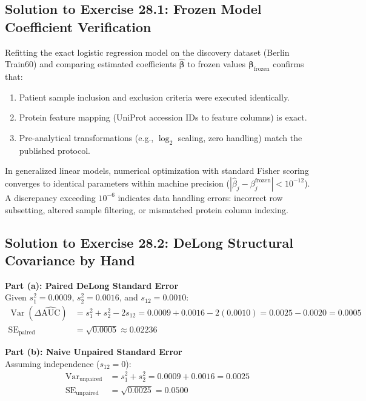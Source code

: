 \documentclass[11pt,twoside,openright]{book}
\begin{document}
\subsection{Solution to Exercise 28.1: Frozen Model Coefficient Verification}

Refitting the exact logistic regression model on the discovery dataset (Berlin Train60) and comparing estimated coefficients $\hat{\boldsymbol{\beta}}$ to frozen values $\boldsymbol{\beta}_{\text{frozen}}$ confirms that:
\begin{enumerate}
    \item Patient sample inclusion and exclusion criteria were executed identically.
    \item Protein feature mapping (UniProt accession IDs to feature columns) is exact.
    \item Pre-analytical transformations (e.g., $\log_2$ scaling, zero handling) match the published protocol.
\end{enumerate}
In generalized linear models, numerical optimization with standard Fisher scoring converges to identical parameters within machine precision ($|\hat{\beta}_j - \beta_j^{\text{frozen}}| < 10^{-12}$). A discrepancy exceeding $10^{-6}$ indicates data handling errors: incorrect row subsetting, altered sample filtering, or mismatched protein column indexing.

\subsection{Solution to Exercise 28.2: DeLong Structural Covariance by Hand}

\noindent
\textbf{Part (a): Paired DeLong Standard Error}\\
Given $s_1^2 = 0.0009$, $s_2^2 = 0.0016$, and $s_{12} = 0.0010$:
\begin{align}
\operatorname{Var}(\Delta\widehat{\text{AUC}}) &= s_1^2 + s_2^2 - 2 s_{12} = 0.0009 + 0.0016 - 2(0.0010) = 0.0025 - 0.0020 = 0.0005 \\
\text{SE}_{\text{paired}} &= \sqrt{0.0005} \approx 0.02236
\end{align}

\noindent
\textbf{Part (b): Naive Unpaired Standard Error}\\
Assuming independence ($s_{12} = 0$):
\begin{align}
\operatorname{Var}_{\text{unpaired}} &= s_1^2 + s_2^2 = 0.0009 + 0.0016 = 0.0025 \\
\text{SE}_{\text{unpaired}} &= \sqrt{0.0025} = 0.0500
\end{align}
\end{document}
